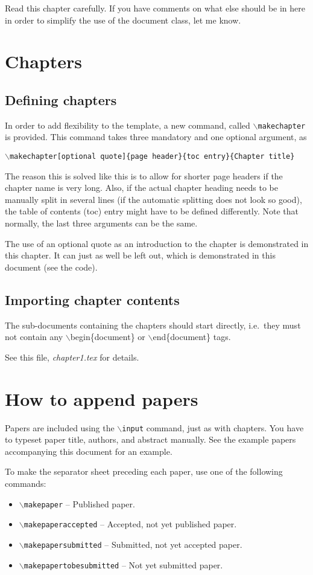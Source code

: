 Read this chapter carefully. If you have comments on what else should be in here in order to simplify the use of the document class, let me know.

\section{Chapters}
\subsection{Defining chapters}
In order to add flexibility to the template, a new command, called \texttt{$\backslash$makechapter} is provided. This command takes three mandatory and one optional argument, as 
\begin{center}
	\texttt{$\backslash$makechapter[optional quote]\{page header\}\{toc entry\}\{Chapter title\}}
\end{center}

The reason this is solved like this is to allow for shorter page headers if the chapter name is very long. Also, if the actual chapter heading needs to be manually split in several lines (if the automatic splitting does not look so good), the table of contents (toc) entry might have to be defined differently. Note that normally, the last three arguments can be the same. 

The use of an optional quote as an introduction to the chapter is demonstrated in this chapter. It can just as well be left out, which is demonstrated in this document (see the code).

\subsection{Importing chapter contents}
The sub-documents containing the chapters should start directly, i.e.\ they must not contain any $\backslash$begin\{document\} or $\backslash$end\{document\} tags.

See this file, \textit{chapter1.tex} for details.

\section{How to append papers}
Papers are included using the \texttt{$\backslash$input} command, just as with chapters. You have to typeset paper title, authors, and abstract manually. See the example papers accompanying this document for an example.

To make the separator sheet preceding each paper, use one of the following commands:
\begin{itemize}
	\item \texttt{$\backslash$makepaper} -- Published paper.
	\item \texttt{$\backslash$makepaperaccepted} -- Accepted, not yet published paper.
	\item \texttt{$\backslash$makepapersubmitted} -- Submitted, not yet accepted paper.
	\item \texttt{$\backslash$makepapertobesubmitted} -- Not yet submitted paper.
\end{itemize}

